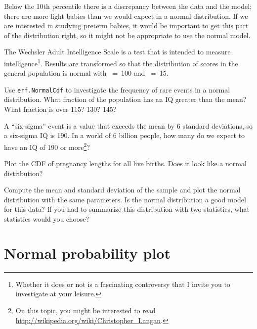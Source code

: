 \documentclass[12pt]{book}
\begin{document}
Below the 10th percentile there is a discrepancy between the data
and the model; there are more light babies than we would expect in
a normal distribution.  If we are interested in studying preterm
babies, it would be important to get this part of the distribution
right, so it might not be appropriate to use the normal
model.

\begin{exercise}
The Wechsler Adult Intelligence Scale is a test that is intended
to measure intelligence\footnote{Whether it does or not is a
fascinating controversy that I invite you to investigate at your
leisure.}.  Results are transformed so that the distribution of scores
in the general population is normal with \mymu~=~100 and \mysigma~=~15.

Use {\tt erf.NormalCdf} to investigate the frequency of rare events in
a normal distribution.  What fraction of the population has an IQ
greater than the mean?  What fraction is over 115?  130?  145?

A ``six-sigma'' event is a value that exceeds the mean by 6 standard
deviations, so a six-sigma IQ is 190.  In a world of 6 billion people,
how many do we expect to have an IQ of 190 or more\footnote{On this
  topic, you might be interested to read
  \url{http://wikipedia.org/wiki/Christopher_Langan}.}?

\end{exercise}


\begin{exercise}
Plot the CDF of pregnancy lengths for all live births.  Does it
look like a normal distribution?

Compute the mean and standard deviation of the sample and plot the normal
distribution with the same parameters.  Is the normal distribution a
good model for this data?  If you had to summarize this distribution
with two statistics, what statistics would you choose?

\end{exercise}


\section{Normal probability plot}
\end{document}
